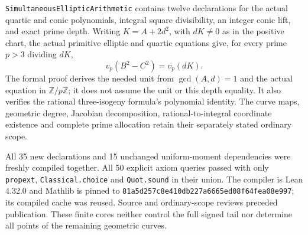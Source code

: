 \texttt{SimultaneousElliptic\allowbreak Arithmetic} contains twelve
declarations for the actual quartic and conic polynomials, integral
square divisibility, an integer conic lift, and exact prime depth.
Writing $K=A+2d^2$, with $dK\ne0$ as in the positive chart,
the actual primitive elliptic and quartic equations
give, for every prime $p>3$ dividing $dK$,
\[
 v_p(B^2-C^2)=v_p(dK).
\]
The formal proof derives the needed unit from $\gcd(A,d)=1$ and the
actual equation in $\mathbb Z/p\mathbb Z$; it does not assume the unit
or this depth equality. It also verifies the rational three-isogeny
formula's polynomial identity. The curve maps, geometric degree,
Jacobian decomposition, rational-to-integral coordinate existence and
complete prime allocation retain their separately stated ordinary scope.

All 35 new declarations and 15 unchanged uniform-moment dependencies
were freshly compiled together. All 50 explicit axiom queries passed
with only \texttt{propext}, \texttt{Classical.choice} and
\texttt{Quot.sound} in their union. The compiler is Lean 4.32.0 and
Mathlib is pinned to
\texttt{81a5d257c8e410db227a6665ed08f64fea08e997}; its compiled cache
was reused. Source and ordinary-scope reviews preceded publication.
These finite cores neither control the full signed tail nor determine
all points of the remaining geometric curves.
